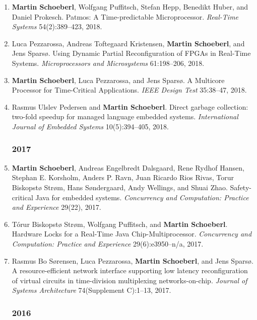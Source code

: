 \begin{enumerate}
\item {\bf Martin Schoeberl}, Wolfgang Puffitsch, Stefan Hepp, Benedikt Huber, and Daniel Prokesch.
 Patmos: A Time-predictable Microprocessor.
 \emph{Real-Time Systems} 54(2):389--423, 2018.

\item Luca Pezzarossa, Andreas Toftegaard Kristensen, {\bf Martin Schoeberl}, and Jens Spars{\o}.
 Using Dynamic Partial Reconfiguration of FPGAs in Real-Time Systems.
 \emph{Microprocessors and Microsystems} 61:198--206, 2018.

\item {\bf Martin Schoeberl}, Luca Pezzarossa, and Jens Spars{\o}.
 A Multicore Processor for Time-Critical Applications.
 \emph{IEEE Design Test} 35:38--47, 2018.

\item Rasmus Ulslev Pedersen and {\bf Martin Schoeberl}.
 Direct garbage collection: two-fold speedup for managed language embedded systems.
 \emph{International Journal of Embedded Systems} 10(5):394--405, 2018.


\subsubsection*{2017}

\item {\bf Martin Schoeberl}, Andreas Engelbredt Dalsgaard, Rene Rydhof Hansen, Stephan E. Korsholm, Anders P. Ravn, Juan Ricardo Rios Rivas, Torur Biskopst{\o} Str{\o}m, Hans S{\o}ndergaard, Andy Wellings, and Shuai Zhao.
 Safety-critical Java for embedded systems.
 \emph{Concurrency and Computation: Practice and Experience} 29(22), 2017.

\item T{\'o}rur Biskopst{\o} Str{\o}m, Wolfgang Puffitsch, and {\bf Martin Schoeberl}.
 Hardware Locks for a Real-Time Java Chip-Multiprocessor.
 \emph{Concurrency and Computation: Practice and Experience} 29(6):e3950--n/a, 2017.

\item Rasmus Bo S{\o}rensen, Luca Pezzarossa, {\bf Martin Schoeberl}, and Jens Spars{\o}.
 A resource-efficient network interface supporting low latency reconfiguration of virtual circuits in time-division multiplexing networks-on-chip.
 \emph{Journal of Systems Architecture} 74(Supplement C):1--13, 2017.


\subsubsection*{2016}


\end{enumerate}
